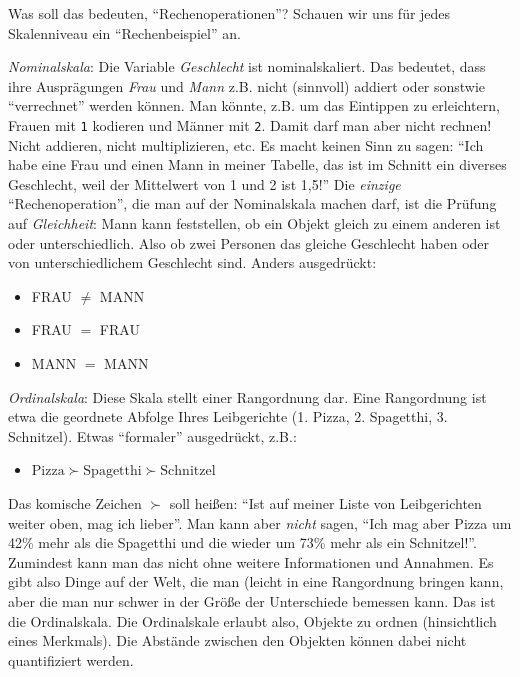 \documentclass[
  letterpaper,
  oneside,
  open=any]{scrbook}
\providecommand{\tightlist}{%
  \setlength{\itemsep}{0pt}\setlength{\parskip}{0pt}}\usepackage{longtable,booktabs,array}
\theoremstyle{definition}
\theoremstyle{definition}
\theoremstyle{definition}
\theoremstyle{remark}
\begin{document}
Was soll das bedeuten, \enquote{Rechenoperationen}? Schauen wir uns für
jedes Skalenniveau ein \enquote{Rechenbeispiel} an.

\emph{Nominalskala}: Die Variable \emph{Geschlecht} ist nominalskaliert.
Das bedeutet, dass ihre Ausprägungen \emph{Frau} und \emph{Mann} z.B.
nicht (sinnvoll) addiert oder sonstwie \enquote{verrechnet} werden
können. Man könnte, z.B. um das Eintippen zu erleichtern, Frauen mit
\texttt{1} kodieren und Männer mit \texttt{2}. Damit darf man aber nicht
rechnen! Nicht addieren, nicht multiplizieren, etc. Es macht keinen Sinn
zu sagen: \enquote{Ich habe eine Frau und einen Mann in meiner Tabelle,
das ist im Schnitt ein diverses Geschlecht, weil der Mittelwert von 1
und 2 ist 1,5!} Die \emph{einzige} \enquote{Rechenoperation}, die man
auf der Nominalskala machen darf, ist die Prüfung auf \emph{Gleichheit}:
Mann kann feststellen, ob ein Objekt gleich zu einem anderen ist oder
unterschiedlich. Also ob zwei Personen das gleiche Geschlecht haben oder
von unterschiedlichem Geschlecht sind. Anders ausgedrückt:

\begin{itemize}
\tightlist
\item
  FRAU \(\ne\) MANN
\item
  FRAU \(=\) FRAU
\item
  MANN \(=\) MANN
\end{itemize}

\emph{Ordinalskala}: Diese Skala stellt einer Rangordnung dar. Eine
Rangordnung ist etwa die geordnete Abfolge Ihres Leibgerichte (1. Pizza,
2. Spagetthi, 3. Schnitzel). Etwas \enquote{formaler} ausgedrückt, z.B.:

\begin{itemize}
\tightlist
\item
  \(\text{Pizza} \succ \text{Spagetthi} \succ \text{Schnitzel}\)
\end{itemize}

Das komische Zeichen \(\succ\) soll heißen: \enquote{Ist auf meiner
Liste von Leibgerichten weiter oben, mag ich lieber}. Man kann aber
\emph{nicht} sagen, \enquote{Ich mag aber Pizza um 42\% mehr als die
Spagetthi und die wieder um 73\% mehr als ein Schnitzel!}. Zumindest
kann man das nicht ohne weitere Informationen und Annahmen. Es gibt also
Dinge auf der Welt, die man (leicht in eine Rangordnung bringen kann,
aber die man nur schwer in der Größe der Unterschiede bemessen kann. Das
ist die Ordinalskala. Die Ordinalskale erlaubt also, Objekte zu ordnen
(hinsichtlich eines Merkmals). Die Abstände zwischen den Objekten können
dabei nicht quantifiziert werden.
\end{document}
